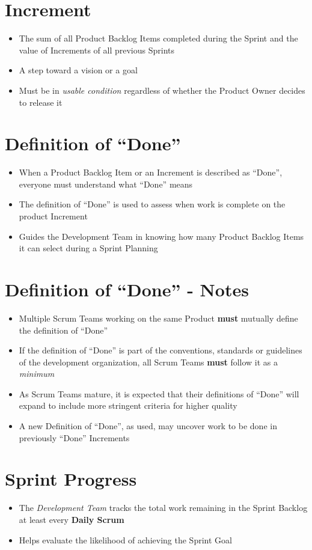 \documentclass[a4paper,11pt,twocolumn]{article}
\begin{document}
\section*{Increment}
\begin{itemize}
	\item The sum of all Product Backlog Items completed during the Sprint and the value of Increments of all previous Sprints
	\item A step toward a vision or a goal
	\item Must be in \textit{usable condition} regardless of whether the Product Owner decides to release it
\end{itemize}

\section*{Definition of ``Done''}
\begin{itemize}
	\item When a Product Backlog Item or an Increment is described as ``Done'', everyone must understand what ``Done'' means
	\item The definition of ``Done'' is used to assess when work is complete on the product Increment
	\item Guides the Development Team in knowing how many Product Backlog Items it can select during a Sprint Planning
\end{itemize}

\section*{Definition of ``Done'' - Notes}
\begin{itemize}
	\item Multiple Scrum Teams working on the same Product \textbf{must} mutually define the definition of ``Done''
	\item If the definition of ``Done'' is part of the conventions, standards or guidelines of the development organization, all Scrum Teams \textbf{must} follow it as a \textit{minimum}
	\item As Scrum Teams mature, it is expected that their definitions of ``Done'' will expand to include more stringent criteria for higher quality
	\item A new Definition of ``Done'', as used, may uncover work to be done in previously ``Done'' Increments
\end{itemize}

\section*{Sprint Progress}
\begin{itemize}
	\item The \textit{Development Team} tracks the total work remaining in the Sprint Backlog at least every \textbf{Daily Scrum}
	\item Helps evaluate the likelihood of achieving the Sprint Goal
\end{itemize}
\end{document}
